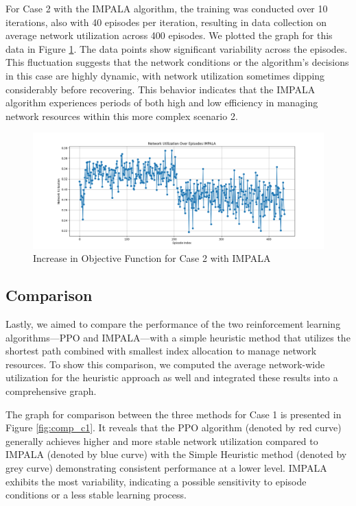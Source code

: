 \documentclass[conference]{IEEEtran}
\begin{document}
For Case 2 with the IMPALA algorithm, the training was conducted over 10 iterations, also with 40 episodes per iteration, resulting in data collection on average network utilization across 400 episodes. We plotted the graph for this data in Figure \ref{fig:obj_c2_impala}. The data points show significant variability across the episodes. This fluctuation suggests that the network conditions or the algorithm's decisions in this case are highly dynamic, with network utilization sometimes dipping considerably before recovering. This behavior indicates that the IMPALA algorithm experiences periods of both high and low efficiency in managing network resources within this more complex scenario 2.

\begin{figure}[htp]
    \centering
    \includegraphics[width=\columnwidth]{images/obj_fn_case2_impala.png}
    \caption{Increase in Objective Function for Case 2 with IMPALA}
    \label{fig:obj_c2_impala}
\end{figure}



\subsection{Comparison}

Lastly, we aimed to compare the performance of the two reinforcement learning algorithms—PPO and IMPALA—with a simple heuristic method that utilizes the shortest path combined with smallest index allocation to manage network resources. To show this comparison, we computed the average network-wide utilization for the heuristic approach as well and integrated these results into a comprehensive graph. 

The graph for comparison between the three methods for Case 1 is presented in Figure \ref{fig:comp_c1}. It reveals that the PPO algorithm (denoted by red curve) generally achieves higher and more stable network utilization compared to IMPALA (denoted by blue curve) with the Simple Heuristic method (denoted by grey curve) demonstrating consistent performance at a lower level. IMPALA exhibits the most variability, indicating a possible sensitivity to episode conditions or a less stable learning process.
\end{document}

